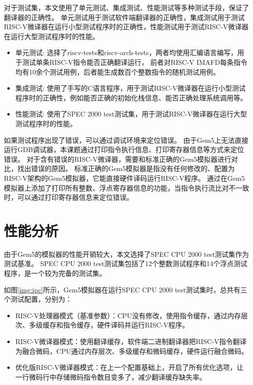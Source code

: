 对于测试集，本文使用了单元测试、集成测试、性能测试等多种测试手段，保证了翻译器的正确性。
单元测试用于测试软件端翻译器的正确性，集成测试用于测试RISC-V微译器在运行小型测试程序时的正确性，性能测试用于测试RISC-V微译器在运行大型测试程序时的性能。
\begin{itemize}
\item 单元测试: 选择了riscv-tests\cite{riscv-tests}和riscv-arch-tests\cite{riscv-arch-tests}，两者均使用汇编语言编写，用于测试单条RISC-V指令能否正确翻译运行，
前者对RISC-V IMAFD每条指令均有10余个测试用例，后者能生成数百个整数指令的随机测试用例。
\item 集成测试: 使用了手写的C语言程序，用于测试RISC-V微译器在运行小型测试程序时的正确性，例如能否正确的初始化栈信息、能否正确处理系统调用等。
\item 性能测试: 使用了SPEC 2000 test测试集，用于测试RISC-V微译器在运行大型测试程序时的性能。
\end{itemize}

如果测试程序出现了错误，可以通过调试环境来定位错误。
由于Gem5上无法直接运行GDB调试器，本课题通过打印指令执行信息、打印寄存器信息等方式来定位错误。
对于含有错误的RISC-V微译器，需要和标准正确的Gem5模拟器进行对比，找出错误的原因。
标准正确的Gem5模拟器是指没有任何修改的、配置为RISC-V架构的Gem5模拟器，它能直接硬件译码运行RISC-V程序。
通过在Gem5模拟器上添加了打印所有整数、浮点寄存器信息的功能，当指令执行流比对不一致时，可以通过打印寄存器信息来定位错误。


\section{性能分析}
由于Gem5的模拟器的性能开销较大，本文选择了SPEC CPU 2000 test测试集作为测试基准。
SPEC CPU 2000 test测试集包括了12个整数测试程序和14个浮点测试程序，是一个较为完备的测试集。

如图\ref{img:ipc}所示，Gem5模拟器在运行SPEC CPU 2000 test测试集时，总共有三个测试配置，分别为：
\begin{itemize}
  \item RISC-V处理器模式（基准参数）：CPU没有修改，使用指令缓存，通过内存层次、多级缓存和指令缓存，硬件译码并运行RISC-V程序。
  \item RISC-V微译器模式：使用翻译缓存，软件端二进制翻译器把RISC-V指令翻译为融合微码，CPU通过内存层次、多级缓存和微码缓存，硬件运行融合微码。
  \item 优化版RISC-V微译器模式：在上一个配置基础上，开启了所有优化选项，让一行微码行中存储微码指令数目变多了，减少翻译缓存缺失率。
\end{itemize}

